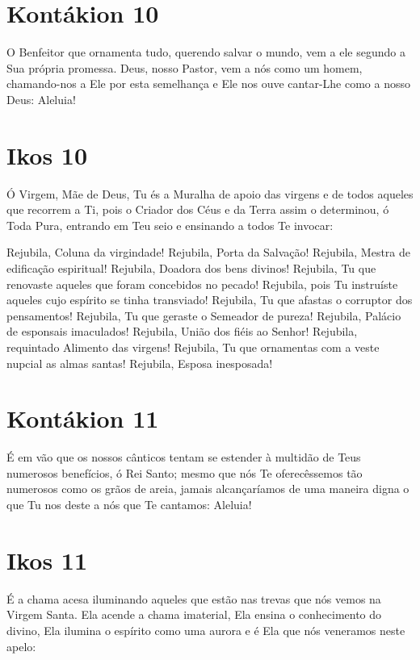 \documentclass{subfiles}
\begin{document}
\section*{Kontákion 10}

O Benfeitor que ornamenta tudo, querendo salvar o mundo, vem a ele
segundo a Sua própria promessa. Deus, nosso Pastor, vem a nós como um
homem, chamando-nos a Ele por esta semelhança e Ele nos ouve cantar-Lhe
como a nosso Deus: Aleluia!

\section*{Ikos 10}

Ó Virgem, Mãe de Deus, Tu és a Muralha de apoio das virgens e de
todos aqueles que recorrem a Ti, pois o Criador dos Céus e da Terra assim o
determinou, ó Toda Pura, entrando em Teu seio e ensinando a todos Te
invocar:

Rejubila, Coluna da virgindade!
Rejubila, Porta da Salvação!
Rejubila, Mestra de edificação espiritual!
Rejubila, Doadora dos bens divinos!
Rejubila, Tu que renovaste aqueles que foram concebidos no pecado!
Rejubila, pois Tu instruíste aqueles cujo espírito se tinha transviado!
Rejubila, Tu que afastas o corruptor dos pensamentos!
Rejubila, Tu que geraste o Semeador de pureza!
Rejubila, Palácio de esponsais imaculados!
Rejubila, União dos fiéis ao Senhor!
Rejubila, requintado Alimento das virgens!
Rejubila, Tu que ornamentas com a veste nupcial as almas santas!
Rejubila, Esposa inesposada!

\section*{Kontákion 11}

É em vão que os nossos cânticos tentam se estender à multidão de
Teus numerosos benefícios, ó Rei Santo; mesmo que nós Te oferecêssemos tão
numerosos como os grãos de areia, jamais alcançaríamos de uma maneira
digna o que Tu nos deste a nós que Te cantamos: Aleluia!

\section*{Ikos 11}

É a chama acesa iluminando aqueles que estão nas trevas que nós
vemos na Virgem Santa. Ela acende a chama imaterial, Ela ensina o
conhecimento do divino, Ela ilumina o espírito como uma aurora e é Ela que
nós veneramos neste apelo:
\end{document}
